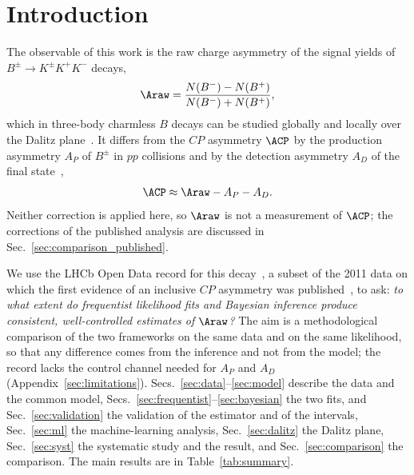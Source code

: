 \section{Introduction}
\label{sec:intro}
The observable of this work is the raw charge asymmetry of the signal yields of $B^{\pm}\to K^{\pm}K^{+}K^{-}$ decays,
\begin{equation}
\Araw=\frac{N(B^-)-N(B^+)}{N(B^-)+N(B^+)} ,
\label{eq:araw}
\end{equation}
which in three-body charmless $B$ decays can be studied globally and locally over the Dalitz plane~\cite{lhcb_cpv_prd2023,lhcb_cpv_paper}. It differs from the $CP$ asymmetry $\ACP$ by the production asymmetry $A_P$ of $B^\pm$ in $pp$ collisions and by the detection asymmetry $A_D$ of the final state~\cite{lhcb_cpv_prd2023},
\begin{equation}
\ACP\approx\Araw-A_P-A_D .
\label{eq:acp}
\end{equation}
Neither correction is applied here, so $\Araw$ is not a measurement of $\ACP$; the corrections of the published analysis are discussed in Sec.~\ref{sec:comparison_published}.

We use the LHCb Open Data record for this decay~\cite{opendata_record,opendata_notebook}, a subset of the 2011 data on which the first evidence of an inclusive $CP$ asymmetry was published~\cite{lhcb_cpv_2013}, to ask: \emph{to what extent do frequentist likelihood fits and Bayesian inference produce consistent, well-controlled estimates of $\Araw$?} The aim is a methodological comparison of the two frameworks on the same data and on the same likelihood, so that any difference comes from the inference and not from the model; the record lacks the control channel needed for $A_P$ and $A_D$ (Appendix~\ref{sec:limitations}). Secs.~\ref{sec:data}--\ref{sec:model} describe the data and the common model, Secs.~\ref{sec:frequentist}--\ref{sec:bayesian} the two fits, and Sec.~\ref{sec:validation} the validation of the estimator and of the intervals, Sec.~\ref{sec:ml} the machine-learning analysis, Sec.~\ref{sec:dalitz} the Dalitz plane, Sec.~\ref{sec:syst} the systematic study and the result, and Sec.~\ref{sec:comparison} the comparison. The main results are in Table~\ref{tab:summary}.

